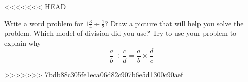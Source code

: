\documentclass{ximera}
\begin{document}
%
%

%
%

<<<<<<< HEAD
=======
\begin{problem}
Write a word problem for $1 \frac{3}{4} \div \frac{1}{2}$?  Draw a picture that will help you solve the problem.  Which model of division did you use?  Try to use your problem to explain why 
$$\frac{a}{b}\div\frac{c}{d}=\frac{a}{b}\times\frac{d}{c}$$
\begin{freeResponse}
\end{freeResponse}
\end{problem}
>>>>>>> 7bdb88c305fe1eca06d82c907b6e5d1300c90aef
\end{document}
